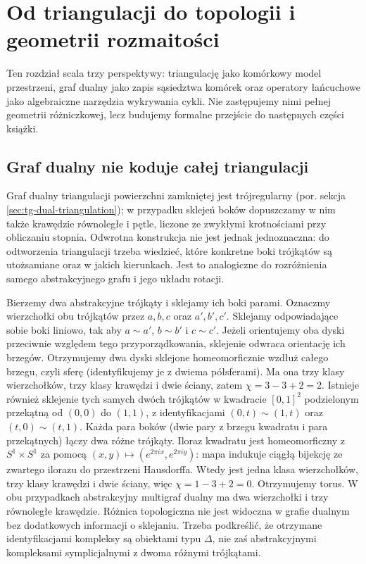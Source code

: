 \chapter{Od triangulacji do topologii i geometrii rozmaitości}
\label{ch:tg-most-geometria}

Ten rozdział scala trzy perspektywy:
triangulację jako komórkowy model przestrzeni,
graf dualny jako zapis sąsiedztwa komórek oraz
operatory łańcuchowe jako algebraiczne narzędzia
wykrywania cykli. Nie zastępujemy nimi pełnej
geometrii różniczkowej, lecz budujemy formalne
przejście do następnych części książki.

\section{Graf dualny nie koduje całej triangulacji}
\label{sec:tg-limit-dual}

Graf dualny triangulacji powierzchni zamkniętej jest
trójregularny (por. sekcja \ref{sec:tg-dual-triangulation});
w przypadku sklejeń boków dopuszczamy w nim także
krawędzie równoległe i pętle, liczone ze zwykłymi
krotnościami przy obliczaniu stopnia. Odwrotna konstrukcja nie jest jednak
jednoznaczna: do odtworzenia triangulacji trzeba wiedzieć,
które konkretne boki trójkątów są utożsamiane oraz
w jakich kierunkach. Jest to analogiczne do rozróżnienia
samego abstrakcyjnego grafu i jego układu rotacji.

\begin{przyklad}
Bierzemy dwa abstrakcyjne trójkąty i sklejamy ich
boki parami. Oznaczmy wierzchołki obu trójkątów przez $a,b,c$
oraz $a',b',c'$. Sklejamy odpowiadające sobie boki
liniowo, tak aby $a\sim a'$, $b\sim b'$ i $c\sim c'$.
Jeżeli orientujemy oba dyski przeciwnie względem
tego przyporządkowania, sklejenie odwraca orientację
ich brzegów. Otrzymujemy dwa dyski sklejone
homeomorficznie wzdłuż całego brzegu, czyli sferę
(identyfikujemy je z dwiema półsferami).
Ma ona trzy klasy wierzchołków, trzy klasy krawędzi
i dwie ściany, zatem $\chi=3-3+2=2$.
Istnieje również sklejenie tych samych dwóch trójkątów
w kwadracie $[0,1]^2$ podzielonym przekątną
od $(0,0)$ do $(1,1)$, z identyfikacjami
$(0,t)\sim(1,t)$ oraz $(t,0)\sim(t,1)$.
Każda para boków (dwie pary z brzegu kwadratu
i para przekątnych) łączy dwa różne trójkąty.
Iloraz kwadratu jest homeomorficzny z $S^1\times S^1$
za pomocą $(x,y)\mapsto(e^{2\pi ix},e^{2\pi iy})$:
mapa indukuje ciągłą bijekcję ze zwartego ilorazu
do przestrzeni Hausdorffa. Wtedy jest jedna klasa wierzchołków,
trzy klasy krawędzi i dwie ściany, więc
$\chi=1-3+2=0$. Otrzymujemy torus.
W obu przypadkach abstrakcyjny multigraf dualny
ma dwa wierzchołki i trzy równoległe krawędzie.
Różnica topologiczna nie jest widoczna w grafie
dualnym bez dodatkowych informacji o sklejaniu.
Trzeba podkreślić, że otrzymane identyfikacjami
kompleksy są obiektami typu $\Delta$, nie zaś
abstrakcyjnymi kompleksami symplicjalnymi z dwoma
różnymi trójkątami.
\end{przyklad}

